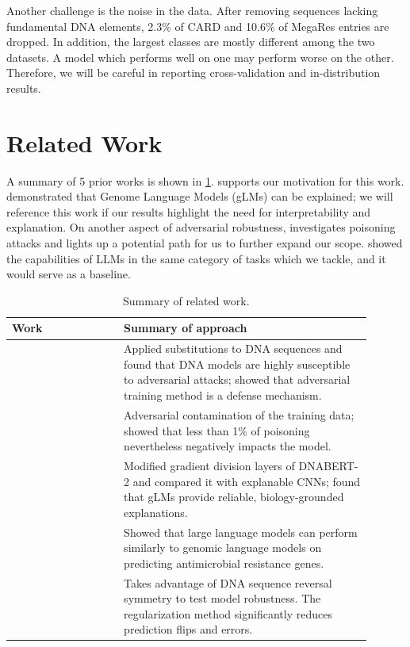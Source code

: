\documentclass{article}
\begin{document}
Another challenge is the noise in the data. After removing sequences lacking fundamental DNA elements, 2.3\% of CARD and 10.6\% of MegaRes entries are dropped. In addition, the largest classes are mostly different among the two datasets. A model which performs well on one may perform worse on the other. Therefore, we will be careful in reporting cross-validation and in-distribution results.


\section{Related Work}
\label{sec:related}

A summary of 5 prior works is shown in \ref{tab:related}. \citet{yoo2024exploring} supports our motivation for this work. \citet{kurth2026explanations} demonstrated that Genome Language Models (gLMs) can be explained; we will reference this work if our results highlight the need for interpretability and explanation. On another aspect of adversarial robustness, \citet{koilakos2026poisoning} investigates poisoning attacks and lights up a potential path for us to further expand our scope. \citet{yoo2025llm} showed the capabilities of LLMs in the same category of tasks which we tackle, and it would serve as a baseline.

\begin{table}[t]
  \caption{Summary of related work.}
  \label{tab:related}
  \centering
  \small
  \begin{tabular}{p{0.28\linewidth}p{0.62\linewidth}}
    \toprule
    Work & Summary of approach \\
    \midrule
    \citet{yoo2024exploring} & Applied substitutions to DNA sequences and found that DNA models are highly susceptible to adversarial attacks; showed that adversarial training method is a defense mechanism. \\
    \citet{koilakos2026poisoning} & Adversarial contamination of the training data; showed that less than 1\% of poisoning nevertheless negatively impacts the model. \\
    \citet{kurth2026explanations} & Modified gradient division layers of DNABERT-2 and compared it with explanable CNNs; found that gLMs provide reliable, biology-grounded explanations. \\
    \citet{yoo2025llm} & Showed that large language models can perform similarly to genomic language models on predicting antimicrobial resistance genes. \\
    \citet{ma2025rccr} & Takes advantage of DNA sequence reversal symmetry to test model robustness. The regularization method significantly reduces prediction flips and errors.\\
    \bottomrule
  \end{tabular}
\end{table}
\end{document}
